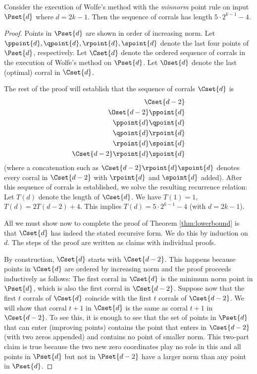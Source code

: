 \newcommand{\thmlength}{5 \cdot 2^{k-1} -4}
\begin{theorem}\label{thm:lowerbound}
Consider the execution of Wolfe's method with the \emph{minnorm} point rule on input $\Pset{d}$ where $d=2k-1$.
Then the sequence of corrals has length $\thmlength$.
\end{theorem}
\begin{proof}
Points in $\Pset{d}$ are shown in order of increasing norm.
Let $\ppoint{d}, \qpoint{d}, \rpoint{d}, \spoint{d}$ denote the last four points of $\Pset{d}$, respectively. 
Let $\Cset{d}$ denote the ordered sequence of corrals in the execution of Wolfe's method on $\Pset{d}$. 
Let $\Oset{d}$ denote the last (optimal) corral in $\Cset{d}$.



The rest of the proof will establish that the sequence of corrals $\Cset{d}$ is
\begin{align*}
\Cset{d-2} \\
\Oset{d-2} \ppoint{d} \\
\ppoint{d} \qpoint{d} \\
\qpoint{d} \rpoint{d} \\
\rpoint{d} \spoint{d} \\
\Cset{d-2} \rpoint{d} \spoint{d}
\end{align*}
(where a concatenation such as $\Cset{d-2} \rpoint{d} \spoint{d}$ denotes every corral in $\Cset{d-2}$ with $\rpoint{d}$ and $\spoint{d}$ added).
After this sequence of corrals is established, we solve the resulting recurrence relation: Let $T(d)$ denote the length of $\Cset{d}$. We have $T(1) = 1$, $T(d) = 2 T(d-2) + 4$. This implies $T(d) = \thmlength$ (with $d=2k-1$).


All we must show now to complete the proof of Theorem \ref{thm:lowerbound} is that $\Cset{d}$ has indeed
the stated recursive form. We do this by induction on $d$. The steps of the proof are written as claims with individual proofs.

By construction, $\Cset{d}$ starts with $\Cset{d-2}$. 
This happens because points in $\Cset{d}$ are ordered by increasing norm and the proof proceeds inductively 
as follows:
The first corral in $\Cset{d}$ is the minimum norm point in $\Pset{d}$, which is also the first corral in $\Cset{d-2}$.
Suppose now that the first $t$ corrals of $\Cset{d}$ coincide with the first $t$ corrals of $\Cset{d-2}$.
We will show that corral $t+1$ in $\Cset{d}$ is the same as corral $t+1$ in $\Cset{d-2}$. 
To see this, it is enough to see that the set of points in $\Pset{d}$ that can enter (improving points) contains 
the point that enters in $\Cset{d-2}$ (with two zeros appended) and contains no point of smaller norm.
This two-part claim is true because the two new zero coordinates play no role in this and all points in $\Pset{d}$ 
but not in $\Pset{d-2}$ have a larger norm than any point in $\Pset{d}$.


\end{proof}

